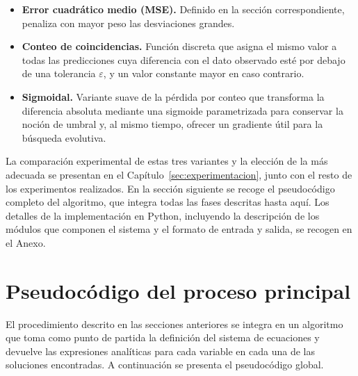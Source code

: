 \begin{itemize} \item \textbf{Error cuadrático medio (MSE).} Definido en la sección correspondiente, penaliza con mayor peso las desviaciones grandes. \item \textbf{Conteo de coincidencias.} Función discreta que asigna el mismo valor a todas las predicciones cuya diferencia con el dato observado esté por debajo de una tolerancia \(\varepsilon\), y un valor constante mayor en caso contrario. \item \textbf{Sigmoidal.} Variante suave de la pérdida por conteo que transforma la diferencia absoluta mediante una sigmoide parametrizada para conservar la noción de umbral y, al mismo tiempo, ofrecer un gradiente útil para la búsqueda evolutiva. \end{itemize}

La comparación experimental de estas tres variantes y la elección de la más adecuada se presentan en el Capítulo~\ref{sec:experimentacion}, junto con el resto de los experimentos realizados. En la sección siguiente se recoge el pseudocódigo completo del algoritmo, que integra todas las fases descritas hasta aquí. Los detalles de la implementación en Python, incluyendo la descripción de los módulos que componen el sistema y el formato de entrada y salida, se recogen en el Anexo.


\section{Pseudocódigo del proceso principal} \label{sec:pseudocodigo_principal}

El procedimiento descrito en las secciones anteriores se integra en un algoritmo que toma como punto de partida la definición del sistema de ecuaciones y devuelve las expresiones analíticas para cada variable en cada una de las soluciones encontradas. A continuación se presenta el pseudocódigo global.

